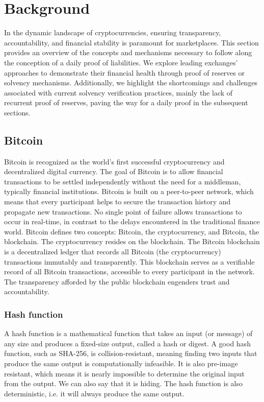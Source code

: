 

\chapter{Background}


In the dynamic landscape of cryptocurrencies, ensuring transparency, accountability, and financial stability
is paramount for marketplaces. This section provides an overview of the concepts and mechanisms
necessary to follow along the conception of a daily proof of liabilities. We explore leading exchanges' approaches
to demonstrate their financial health through proof of reserves or solvency mechanisms. Additionally, we
highlight the shortcomings and challenges associated with current solvency verification practices, mainly the lack of recurrent proof of reserves,
paving the way for a daily proof in the subsequent sections.




\section{Bitcoin}
Bitcoin is recognized as the world's first successful cryptocurrency and decentralized digital currency.
The goal of Bitcoin is to allow financial transactions to be settled independently without the need for a middleman, typically financial institutions.
Bitcoin is built on a peer-to-peer network, which means that every participant helps to secure the transaction history and propagate new transactions.
No single point of failure allows transactions to occur in real-time, in contrast to the delays encountered in the traditional finance world.
Bitcoin defines two concepts: Bitcoin, the cryptocurrency, and Bitcoin, the blockchain. The cryptocurrency resides on the blockchain.
The Bitcoin blockchain is a decentralized ledger that records all Bitcoin (the cryptocurrency) transactions immutably and transparently.
This blockchain serves as a verifiable record of all Bitcoin transactions, accessible to every participant in the network.
The transparency afforded by the public blockchain engenders trust and accountability. \cite{MB17}

\subsection{Hash function}
A hash function is a mathematical function that takes an input (or message) of any size and produces a fixed-size output, called a hash or digest.
A good hash function, such as SHA-256, is collision-resistant, meaning finding two inputs that produce the same output is computationally infeasible. 
It is also pre-image resistant, which means it is nearly impossible to determine the original input from the output. We can also say that it is hiding.
The hash function is also deterministic, i.e. it will always produce the same output.


